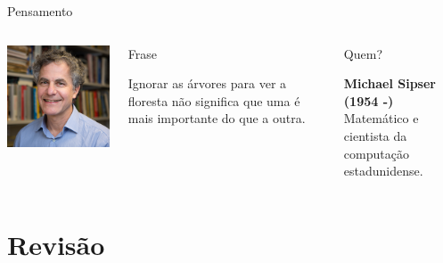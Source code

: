 \documentclass[xcolor=dvipsnames,table]{beamer}
\begin{document}
	\begin{frame}{Pensamento}
		\begin{columns}
		  		\begin{center}
		    		\includegraphics[height=.5\textheight]{images/sipser.png}
		  		\end{center}
				\begin{block}{Frase}
					\begin{center}
						{\large Ignorar as árvores para ver a floresta não significa que uma é mais importante do que a outra.}
					\end{center}
				\end{block}		  		
		  		\begin{block}{Quem?}
		  			\begin{center}
						{\bf Michael Sipser (1954 -)} \\ Matemático e cientista da computação estadunidense.
					\end{center}
				\end{block}
		\end{columns}
	\end{frame}
	

\section{Revisão}	
\end{document}
